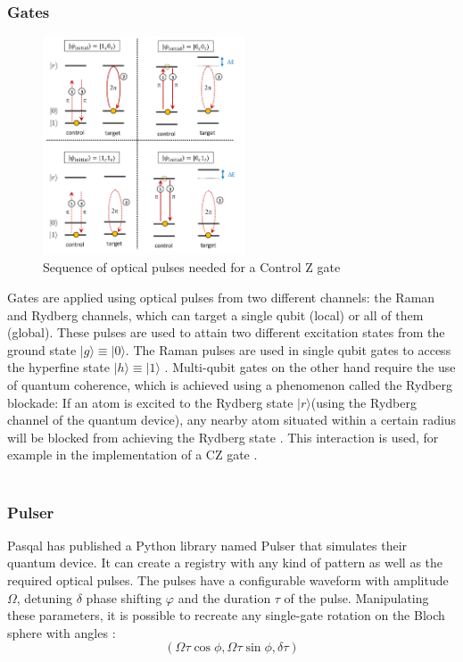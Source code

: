 \subsubsection{Gates}
\begin{figure}
  \centering
  \includegraphics[width=60mm]{./Images/CZbeams.png}
  \caption{Sequence of optical pulses needed for a Control Z gate \cite{silverioPulserOpensourcePackage2022}} 
  \label{fig:CZ}

\end{figure}
Gates are applied using optical pulses from two different channels: the Raman and Rydberg channels, which can target a single qubit (local) or all of them (global). 
These pulses are used to attain two different excitation states from the ground state $|g \rangle \equiv|0 \rangle$. The Raman pulses are used in single qubit gates to access the hyperfine state $|h \rangle \equiv |1 \rangle$ \cite{tsaiPulselevelSchedulingQuantum2022}.
Multi-qubit gates on the other hand require the use of quantum coherence, which is achieved using a phenomenon called the Rydberg blockade: If an atom is excited to the Rydberg state $|r \rangle$\cite{cohenQuantumComputingCircular2021}(using the Rydberg channel of the quantum device), any nearby atom situated
within a certain radius will be blocked from achieving the Rydberg state \cite{saffmanQuantumComputingAtomic2016}. This interaction is used, for example in the implementation of a CZ gate \cite{saffmanQuantumInformationRydberg2010}. 
\\ \\

\subsubsection{Pulser}

Pasqal has published a Python library named Pulser that simulates their quantum device. It can create a registry with any kind of pattern as well as the required optical pulses.
The pulses have a configurable waveform with amplitude $\Omega$, detuning $\delta$ phase shifting $\varphi$ and the duration $\tau$ of the pulse. Manipulating these parameters, it is possible to recreate any single-gate rotation on the
 Bloch sphere with angles :
 $$(\Omega\tau\cos\phi,\Omega\tau\sin\phi,\delta\tau)$$\cite{henrietQuantumComputingNeutral2020}
 
